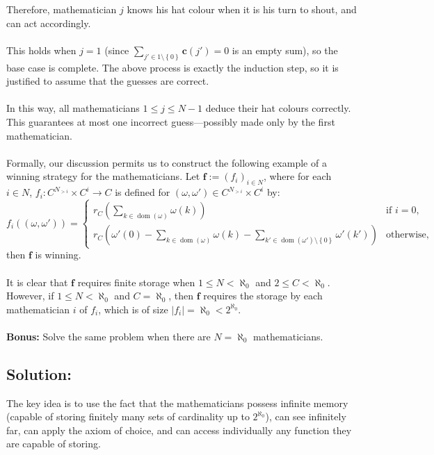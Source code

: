 \documentclass[11pt, a4paper, oneside]{article}
\newcommand{\solution}[1][]{\subsection*{#1}\hfill \par}
\theoremstyle{remark}
\theoremstyle{lemma}
\begin{document}
Therefore, mathematician \(j\) knows his hat colour when it is his turn to shout, and can act accordingly.
\\\\
This holds when \(j = 1\) (since \(\sum_{j' \in 1 \setminus \left\{ 0 \right\}} \mathbf{c}(j') = 0\) is an empty sum), so the base case is complete. The above process is exactly the induction step, so it is justified to assume that the guesses are correct.
\\\\
In this way, all mathematicians \(1 \leq j \leq N - 1\) deduce their hat colours correctly. This guarantees at most one incorrect guess—possibly made only by the first mathematician.
\\\\
Formally, our discussion permits us to construct the following example of a winning strategy for the mathematicians. Let \(\mathbf{f} := \left( f_i \right)_{i \in N}\), where for each \(i \in N\), \(f_i : C^{N_{>i}} \times C^i \rightarrow C\) is defined for \(\left( \omega, \omega' \right) \in C^{N_{>i}} \times C^i\) by:
\[
f_i\left( \left( \omega, \omega' \right) \right) = 
\begin{cases}
r_{C}\left( \sum_{k \in \operatorname{dom}\left( \omega \right)} \omega(k) \right) & \text{if } i = 0, \\
r_{C}\left( \omega'(0) - \sum_{k \in \operatorname{dom}\left( \omega \right)} \omega(k) - \sum_{k' \in \operatorname{dom}\left( \omega' \right) \setminus \left\{ 0 \right\}} \omega'(k') \right) & \text{otherwise},
\end{cases}
\]
then \(\mathbf{f}\) is winning.
\\\\
It is clear that \(\mathbf{f}\) requires finite storage when \(1 \leq N < \aleph_0\) and \(2 \leq C < \aleph_0\). However, if \(1 \leq N < \aleph_0\) and \(C = \aleph_0\), then \(\mathbf{f}\) requires the storage by each mathematician \(i\) of \(f_i\), which is of size \(\left| f_i \right| = \aleph_0 < 2^{\aleph_0}\).
\\\\
\textbf{Bonus:} Solve the same problem when there are \(N = \aleph_0\) mathematicians.
\solution[Solution:]
The key idea is to use the fact that the mathematicians possess infinite memory (capable of storing finitely many sets of cardinality up to \(2^{\aleph_0}\)), can see infinitely far, can apply the axiom of choice, and can access individually any function they are capable of storing.
\\\\
\end{document}
